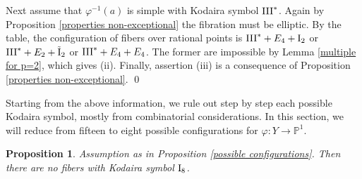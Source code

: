 \documentclass[oneside, 12pt]{amsart}
\newcommand\mylabel[1]{\label{#1}\marginpar{\vspace{-1ex}\medskip\medskip\footnotesize \tt #1}}
\renewcommand\mylabel[1]{\label{#1}}
\newtheorem{proposition}[theorem]{Proposition}
\theoremstyle{definition}
\theoremstyle{remark}
\newcommand{\PP}{\mathbb{P}}
\newcommand{\I}{\text{\rm I}}
\newcommand{\III}{\text{\rm III}}
\newcommand{\tI}{\text{\rm \~{I}}}
\newcommand{\ra}{\rightarrow}
\begin{document}
Next assume that $\varphi^{-1}(a)$ is simple with Kodaira symbol $\III^*$.
Again by Proposition \ref{properties non-exceptional} the fibration must be elliptic. By the table, the configuration
of fibers over rational points is $\III^*+E_4+\I_2$ or  $\III^*+E_2+\tI_2$ or $\III^*+E_4+E_4$.
The former are impossible by Lemma \ref{multiple for p=2}, which gives (ii).
Finally, assertion (iii) is a consequence of    Proposition \ref{properties non-exceptional}.
\qed

\medskip
Starting from the above information, we rule out step by step each possible Kodaira symbol, 
mostly from combinatorial considerations.  In this section, we will reduce
from fifteen to eight possible configurations for $\varphi:Y\ra\PP^1$.

\begin{proposition}
\mylabel{no I8}
Assumption as in Proposition \ref{possible configurations}.
Then there are no fibers with   Kodaira symbol $\I_8$. 
\end{proposition}
\end{document}
